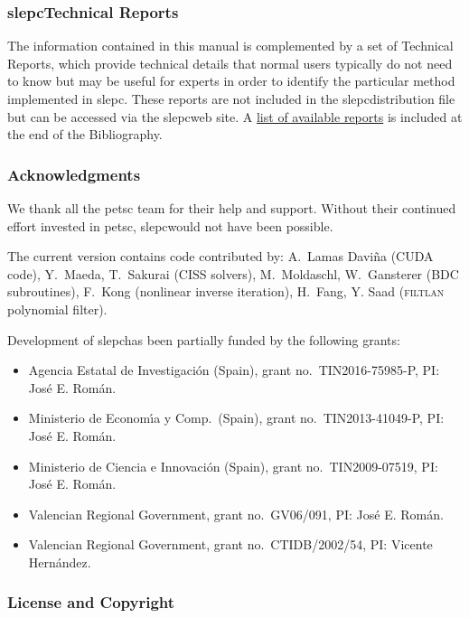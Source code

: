 \documentclass[titlepage,10pt,a4paper]{book}
\newcommand{\packnoi}[1]{{\sc #1}\xspace}
\newcommand{\slepc}{\texorpdfstring{\packnoi{slep\rm c}}{{SLEPc}}}
\begin{document}
{\subsubsection*{\slepc Technical Reports}

	The information contained in this manual is complemented by a set of Technical Reports, which provide technical details that normal users typically do not need to know but may be useful for experts in order to identify the particular method implemented in \slepc. These reports are not included in the \slepc distribution file but can be accessed via the \slepc web site. A \hyperlink{str}{list of available reports} is included at the end of the Bibliography.


\subsubsection*{Acknowledgments}

	We thank all the \packnoi{pets\rm c} team for their help and support. Without their continued effort invested in \packnoi{pets\rm c}, \slepc would not have been possible.

	The current version contains code contributed by:
A.\ Lamas Davi\~{n}a (CUDA code),
Y.\ Maeda, T.\ Sakurai (CISS solvers),
M.\ Moldaschl, W.\ Gansterer (BDC subroutines),
F.\ Kong (nonlinear inverse iteration),
H.\ Fang, Y. Saad (\textsc{filtlan} polynomial filter).

	Development of \slepc has been partially funded by the following grants:
\begin{itemize}
\setlength{\itemsep}{-2pt}
\item Agencia Estatal de Investigaci\'on (Spain), grant no.\ TIN2016-75985-P, PI: Jos\'e E. Rom\'an.
\item Ministerio de Econom\'{\i}a y Comp.\ (Spain), grant no.\ TIN2013-41049-P, PI: Jos\'e E. Rom\'an.
\item Ministerio de Ciencia e Innovaci\'on (Spain), grant no.\ TIN2009-07519, PI: Jos\'e E. Rom\'an.
\item Valencian Regional Government, grant no.\ GV06/091, PI: Jos\'e E. Rom\'an.
\item Valencian Regional Government, grant no.\ CTIDB/2002/54, PI: Vicente Hern\'andez.
\end{itemize}

\subsubsection*{License and Copyright}

}
\end{document}
